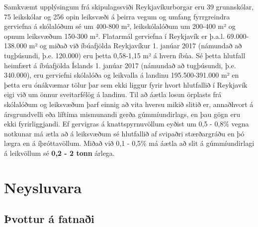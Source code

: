 \documentclass[icelandic,]{book}
\begin{document}
Samkvæmt upplýsingum frá skipulagssviði Reykjavíkurborgar eru 39 grunnskólar, 75 leikskólar og 256 opin leiksvæði á þeirra vegum og umfang fyrrgreindra gerviefna á skólalóðum sé um 400-800 m², leikskólalóðum um 200-400 m² og opnum leiksvæðum 150-300 m². Flatarmál gerviefna í Reykjavík er þ.a.l. 69.000-138.000 m² og miðað við íbúafjölda Reykjavíkur 1. janúar 2017 (námundað að tugþúsundi, þ.e. 120.000) eru þetta 0,58-1,15 m² á hvern íbúa. Sé þetta hlutfall heimfært á íbúafjölda Íslands 1. janúar 2017 (námundað að tugþúsundi, þ.e. 340.000), eru gerviefni skólalóða og leikvalla á landinu 195.500-391.000 m² en þetta eru ónákvæmar tölur þar sem ekki liggur fyrir hvort hlutfallið í Reykjavík eigi við um önnur sveitarfélög á landinu. Til að áætla losun örplasts frá skólalóðum og leiksvæðum þarf einnig að vita hversu mikið slitið er, annaðhvort á ársgrundvelli eða líftíma mismunandi gerða gúmmíundirlags, en þau gögn eru ekki fyrirliggjandi. Ef gervigras á knattspyrnuvöllum eyðist um 0,5 - 0,8\% vegna notkunar má ætla að á leiksvæðum sé hlutfallið af svipaðri stærðargráðu en þó lægra en á íþróttavöllum. Miðað við 0,1 - 0,5\% má áætla að slit á gúmmíundirlagi á leikvöllum sé \textbf{0,2 - 2 tonn} árlega.

\hypertarget{neysluvara}{%
\section*{Neysluvara}\label{neysluvara}}

\hypertarget{vottur-a-fatnai}{%
\subsection*{Þvottur á fatnaði}\label{vottur-a-fatnai}}
\end{document}
